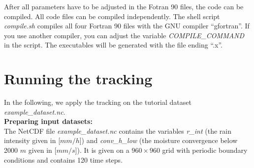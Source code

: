 \documentclass[11pt]{article}
\begin{document}
After all parameters have to be adjusted in the Fotran 90 files, the code can be compiled. All code files can be compiled independently. The shell script {\it compile.sh} compiles all four Fortran 90 files with the GNU compiler ``gfortran''. If you use another compiler, you can adjust the variable {\it COMPILE\_COMMAND} in the script. The executables will be generated with the file ending ``.x''.

\section{Running the tracking}

In the following, we apply the tracking on the tutorial dataset {\it example\_dataset.nc}.\vspace{0.5cm} \\
{\bf Preparing input datasets:}\\
The NetCDF file {\it example\_dataset.nc} contains the variables {\it r\_int} (the rain intensity given in [$mm/h$]) and {\it conv\_h\_low} (the moisture convergence below 2000 $m$ given in [$mm/s$]). It is given on a $960\times 960$ grid with periodic boundary conditions and contains 120 time steps.
\end{document}
